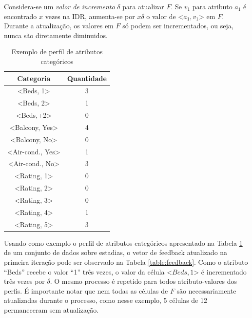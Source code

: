 Considera-se um {\em valor de incremento} $\delta$ para atualizar $F$. Se $v_1$ para atributo $a_1$ é encontrado $x$ vezes na IDR, aumenta-se por $x\delta$ o valor de \textless{}$a_1, v_1$\textgreater{} em $F$. Durante a atualização, os valores em $F$ só podem ser incrementados, ou seja, nunca são diretamente diminuidos.

\begin{table}[!h]
	\centering
	\begin{tabular}{|c|c|}
	\hline
	\textbf{Categoria}                      & \textbf{Quantidade} \\ \hline
	\textless{}Beds, 1\textgreater{}        & 3                   \\ \hline
	\textless{}Beds, 2\textgreater{}        & 1                   \\ \hline
	\textless{}Beds,+2\textgreater{}        & 0                   \\ \hline
	\textless{}Balcony, Yes\textgreater{}   & 4                   \\ \hline
	\textless{}Balcony, No\textgreater{}    & 0                   \\ \hline
	\textless{}Air-cond., Yes\textgreater{} & 1                   \\ \hline
	\textless{}Air-cond., No\textgreater{}  & 3                   \\ \hline
	\textless{}Rating, 1\textgreater{}      & 0                   \\ \hline
	\textless{}Rating, 2\textgreater{}      & 0                   \\ \hline
	\textless{}Rating, 3\textgreater{}      & 0                   \\ \hline
	\textless{}Rating, 4\textgreater{}      & 1                   \\ \hline
	\textless{}Rating, 5\textgreater{}      & 3                   \\ \hline
	\end{tabular}
	\caption{Exemplo de perfil de atributos categóricos}
	\label{table:attribs}
\end{table}

Usando como exemplo o perfil de atributos categóricos apresentado na Tabela \ref{table:attribs} de um conjunto de dados sobre estadias, o vetor de feedback atualizado na primeira iteração pode ser observado na Tabela \ref{table:feedback}. Como o atributo ``Beds'' recebe o valor ``1'' três vezes, o valor da célula \textless{}$Beds, 1$\textgreater{} é incrementado três vezes por $\delta$. O mesmo processo é repetido para todos atributo-valores dos perfis. É importante notar que nem todas as células de $F$ são necessariamente atualizadas durante o processo, como nesse exemplo, 5 células de 12 permaneceram sem atualização.

